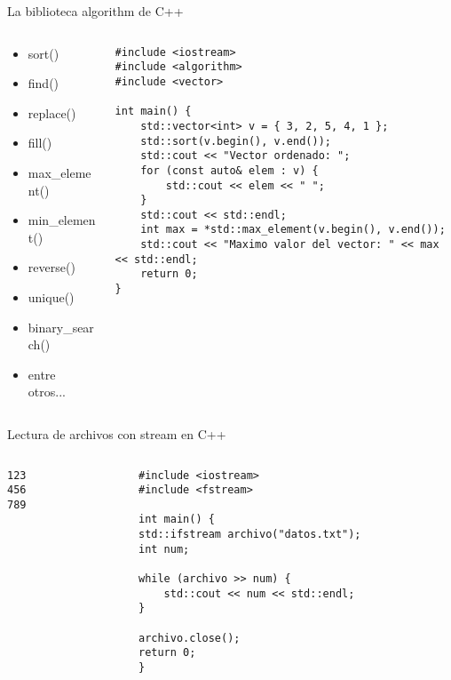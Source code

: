 \documentclass{beamer}
\begin{document}
\begin{frame}[fragile]{La biblioteca algorithm de C++}
\begin{columns}
\begin{column}{0.3\textwidth}
\begin{itemize}
    \item sort()
    \item find()
    \item replace()
    \item fill()
    \item max\_element()
    \item min\_element()
    \item reverse()
    \item unique()
    \item binary\_search()
    \item entre otros...
\end{itemize}
\end{column}

    \begin{column}{0.7\textwidth}
\begin{verbatim}
#include <iostream>
#include <algorithm>
#include <vector>

int main() {
    std::vector<int> v = { 3, 2, 5, 4, 1 };
    std::sort(v.begin(), v.end());
    std::cout << "Vector ordenado: ";
    for (const auto& elem : v) {
        std::cout << elem << " ";
    }
    std::cout << std::endl;
    int max = *std::max_element(v.begin(), v.end());
    std::cout << "Maximo valor del vector: " << max << std::endl;
    return 0;
}
\end{verbatim}
    \end{column}

\end{columns}

\end{frame}


\begin{frame}[fragile]{Lectura de archivos con stream en C++}

\begin{columns}[T]
\begin{column}{0.45\textwidth}

\begin{verbatim}
123
456
789
\end{verbatim}
\end{column}
\begin{column}{0.55\textwidth}
\begin{verbatim}
#include <iostream>
#include <fstream>

int main() {
std::ifstream archivo("datos.txt");
int num;

while (archivo >> num) {
    std::cout << num << std::endl;
}

archivo.close();
return 0;
}
\end{verbatim}
\end{column}
\end{columns}

\end{frame}
\end{document}
